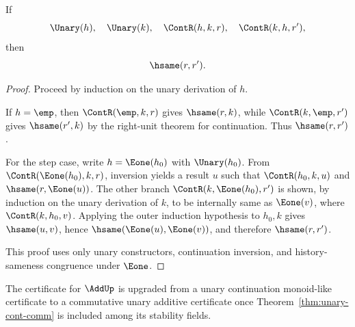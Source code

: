 \begin{theorem}
\label{thm:unary-cont-comm}
If
$$
  \Unary(h),\quad \Unary(k),\quad
  \ContR(h,k,r),\quad \ContR(k,h,r'),
$$
then
$$
  \hsame(r,r').
$$
\end{theorem}

\begin{proof}
Proceed by induction on the unary derivation of \(h\).

If \(h=\emp\), then \(\ContR(\emp,k,r)\) gives \(\hsame(r,k)\), while \(\ContR(k,\emp,r')\) gives \(\hsame(r',k)\) by the right-unit theorem for continuation. Thus \(\hsame(r,r')\).

For the step case, write \(h=\Eone(h_0)\) with \(\Unary(h_0)\). From \(\ContR(\Eone(h_0),k,r)\), inversion yields a result \(u\) such that \(\ContR(h_0,k,u)\) and \(\hsame(r,\Eone(u))\). The other branch \(\ContR(k,\Eone(h_0),r')\) is shown, by induction on the unary derivation of \(k\), to be internally same as \(\Eone(v)\), where \(\ContR(k,h_0,v)\). Applying the outer induction hypothesis to \(h_0,k\) gives \(\hsame(u,v)\), hence \(\hsame(\Eone(u),\Eone(v))\), and therefore \(\hsame(r,r')\).

This proof uses only unary constructors, continuation inversion, and history-sameness congruence under \(\Eone\).
\end{proof}

\begin{corollary}
\label{cor:upgrade-additive-naming-certificate}
\label{cor:additive-certificate-upgrade}
The certificate for \(\AddUp\) is upgraded from a unary continuation monoid-like certificate to a commutative unary additive certificate once Theorem~\ref{thm:unary-cont-comm} is included among its stability fields.
\end{corollary}

